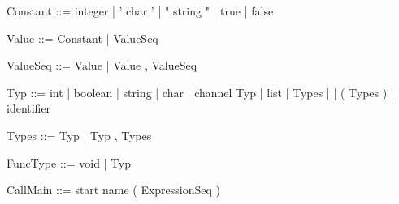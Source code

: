 \documentclass[11pt]{report}
\begin{document}
\begin{verbnobox}[\normalfont]
Constant ::= integer
             | ' char '
             | " string "
             | true
             | false
\end{verbnobox}
\vspace*{3pt}

\begin{verbnobox}[\normalfont]
Value ::= Constant | { ValueSeq }
\end{verbnobox}
\vspace*{3pt}

\begin{verbnobox}[\normalfont]
ValueSeq ::= Value | Value , ValueSeq
\end{verbnobox}
\vspace*{3pt}

\begin{verbnobox}[\normalfont]
Typ ::= int
      | boolean
      | string
      | char
      | channel Typ
      | list [ Types ]
      | ( Types )
      | identifier
\end{verbnobox}
\vspace*{3pt}

\begin{verbnobox}[\normalfont]
Types ::= Typ | Typ , Types
\end{verbnobox}
\vspace*{3pt}

\begin{verbnobox}[\normalfont]
FuncType ::= void | Typ
\end{verbnobox}
\vspace*{3pt}

\begin{verbnobox}[\normalfont]
CallMain ::= start name ( ExpressionSeq )
\end{verbnobox}
\vspace*{3pt}
\end{document}
